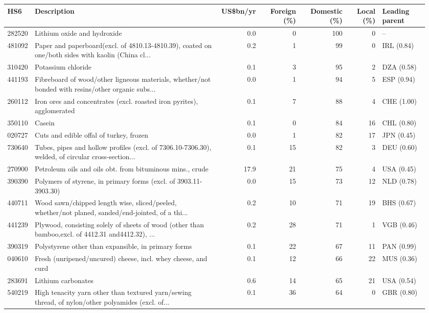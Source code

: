 \begin{tabular}{@{}l p{6.4cm} r r r r l@{}}
\toprule
HS6 & Description & US\$bn/yr & Foreign (\%) & Domestic (\%) & Local (\%) & Leading parent \\
\midrule
282520 & Lithium oxide and hydroxide & 0.0 & 0 & 100 & 0 & -- \\
481092 & Paper and paperboard(excl. of 4810.13-4810.39), coated on one/\allowbreak{}both sides with kaolin (China cl... & 0.2 & 1 & 99 & 0 & IRL (0.84) \\
310420 & Potassium chloride & 0.1 & 3 & 95 & 2 & DZA (0.58) \\
441193 & Fibreboard of wood/\allowbreak{}other ligneous materials, whether/\allowbreak{}not bonded with resins/\allowbreak{}other organic subs... & 0.0 & 1 & 94 & 5 & ESP (0.94) \\
260112 & Iron ores and concentrates (excl. roasted iron pyrites), agglomerated & 0.1 & 7 & 88 & 4 & CHE (1.00) \\
350110 & Casein & 0.1 & 0 & 84 & 16 & CHL (0.80) \\
020727 & Cuts and edible offal of turkey, frozen & 0.0 & 1 & 82 & 17 & JPN (0.45) \\
730640 & Tubes, pipes and hollow profiles (excl. of 7306.10-7306.30), welded, of circular cross-section... & 0.1 & 15 & 82 & 3 & DEU (0.60) \\
270900 & Petroleum oils and oils obt. from bituminous mins., crude & 17.9 & 21 & 75 & 4 & USA (0.45) \\
390390 & Polymers of styrene, in primary forms (excl. of 3903.11-3903.30) & 0.0 & 15 & 73 & 12 & NLD (0.78) \\
440711 & Wood sawn/\allowbreak{}chipped length wise, sliced/\allowbreak{}peeled, whether/\allowbreak{}not planed, sanded/\allowbreak{}end-jointed, of a thi... & 0.2 & 10 & 71 & 19 & BHS (0.67) \\
441239 & Plywood, consisting solely of sheets of wood (other than bamboo,excl. of 4412.31 and4412.32), ... & 0.2 & 28 & 71 & 1 & VGB (0.46) \\
390319 & Polystyrene other than expansible, in primary forms & 0.1 & 22 & 67 & 11 & PAN (0.99) \\
040610 & Fresh (unripened/\allowbreak{}uncured) cheese, incl. whey cheese, and curd & 0.1 & 12 & 66 & 22 & MUS (0.36) \\
283691 & Lithium carbonates & 0.6 & 14 & 65 & 21 & USA (0.54) \\
540219 & High tenacity yarn other than textured yarn/\allowbreak{}sewing thread, of nylon/\allowbreak{}other polyamides (excl. of... & 0.1 & 36 & 64 & 0 & GBR (0.80) \\

\end{tabular}
